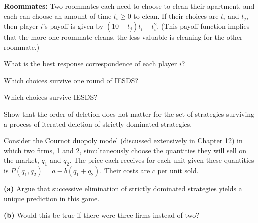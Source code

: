 \textbf{Roommates:} Two roommates each need to choose to clean their apartment, and each
can choose an amount of time $t_i \ge 0$ to clean. If their choices are $t_i$ and $t_j$, then
player $i$'s payoff is given by $(10 - t_j)t_i - t_i^2$. (This payoff function implies that the more
one roommate cleans, the less valuable is cleaning for the other roommate.)
\begin{partes}
\item What is the best response correspondence of each player $i$?
\item Which choices survive one round of IESDS?
\item Which choices survive IESDS?
\end{partes}
\resolespaco


Show that the order of deletion does not matter for the set of strategies
surviving a process of iterated deletion of strictly dominated strategies.
\resolespaco


Consider the Cournot duopoly model (discussed extensively in Chapter 12)
in which two firms, 1 and 2, simultaneously choose the quantities they will sell on the market,
$q_1$ and $q_2$. The price each receives for each unit given these quantities is
$P(q_1, q_2) = a - b(q_1 + q_2)$. Their costs are $c$ per unit sold.

\textbf{(a)} Argue that successive elimination of strictly dominated strategies yields a unique
prediction in this game.

\textbf{(b)} Would this be true if there were three firms instead of two?
\resolespaco
